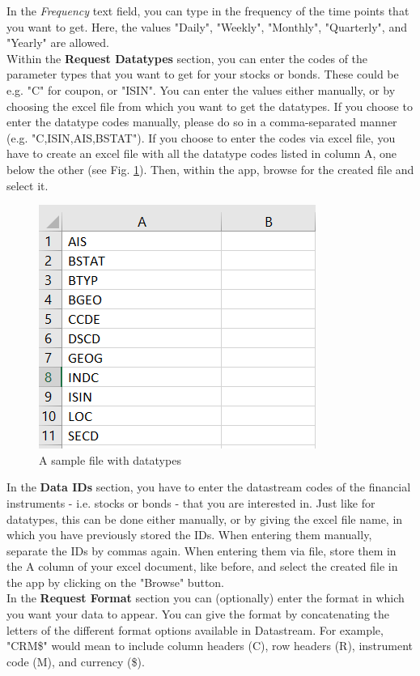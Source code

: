 In the \textit{Frequency} text field, you can type in the frequency of the time points that you want to get. Here, the values "Daily", "Weekly", "Monthly", "Quarterly", and "Yearly" are allowed. \\

Within the \textbf{Request Datatypes} section, you can enter the codes of the parameter types that you want to get for your stocks or bonds. These could be e.g. "C" for coupon, or "ISIN". You can enter the values either manually, or by choosing the excel file from which you want to get the datatypes. If you choose to enter the datatype codes manually, please do so in a comma-separated manner (e.g. "C,ISIN,AIS,BSTAT"). If you choose to enter the codes via excel file, you have to create an excel file with all the datatype codes listed in column A, one below the other (see Fig. \ref{fig:file-datatypes}). Then, within the app, browse for the created file and select it.

\begin{figure}[h]
	\centering
	\includegraphics[width=0.4\linewidth,height=0.35\linewidth]{figures/enter-datatypes.png}
	\caption{A sample file with datatypes}
	\label{fig:file-datatypes}
\end{figure}

In the \textbf{Data IDs} section, you have to enter the datastream codes of the financial instruments - i.e. stocks or bonds - that you are interested in. Just like for datatypes, this can be done either manually, or by giving the excel file name, in which you have previously stored the IDs. When entering them manually, separate the IDs by commas again. When entering them via file, store them in the A column of your excel document, like before, and select the created file in the app by clicking on the "Browse" button. \\

In the \textbf{Request Format} section you can (optionally) enter the format in which you want your data to appear. You can give the format by concatenating the letters of the different format options available in Datastream. For example, "CRM\$" would mean to include column headers (C), row headers (R), instrument code (M), and currency (\$). \\

